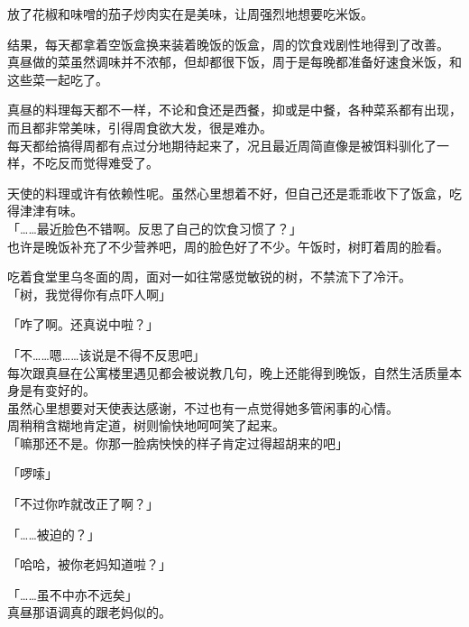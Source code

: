 放了花椒和味噌的茄子炒肉实在是美味，让周强烈地想要吃米饭。\\

\vspace{2\baselineskip}

结果，每天都拿着空饭盒换来装着晚饭的饭盒，周的饮食戏剧性地得到了改善。\\

真昼做的菜虽然调味并不浓郁，但却都很下饭，周于是每晚都准备好速食米饭，和这些菜一起吃了。

真昼的料理每天都不一样，不论和食还是西餐，抑或是中餐，各种菜系都有出现，而且都非常美味，引得周食欲大发，很是难办。\\

每天都给搞得周都有点过分地期待起来了，况且最近周简直像是被饵料驯化了一样，不吃反而觉得难受了。

天使的料理或许有依赖性呢。虽然心里想着不好，但自己还是乖乖收下了饭盒，吃得津津有味。\\

「……最近脸色不错啊。反思了自己的饮食习惯了？」\\

也许是晚饭补充了不少营养吧，周的脸色好了不少。午饭时，树盯着周的脸看。

吃着食堂里乌冬面的周，面对一如往常感觉敏锐的树，不禁流下了冷汗。\\

「树，我觉得你有点吓人啊」

「咋了啊。还真说中啦？」

「不……嗯……该说是不得不反思吧」\\

每次跟真昼在公寓楼里遇见都会被说教几句，晚上还能得到晚饭，自然生活质量本身是有变好的。\\

虽然心里想要对天使表达感谢，不过也有一点觉得她多管闲事的心情。\\

周稍稍含糊地肯定道，树则愉快地呵呵笑了起来。\\

「嘛那还不是。你那一脸病怏怏的样子肯定过得超胡来的吧」

「啰嗦」

「不过你咋就改正了啊？」

「……被迫的？」

「哈哈，被你老妈知道啦？」

「……虽不中亦不远矣」\\

真昼那语调真的跟老妈似的。

